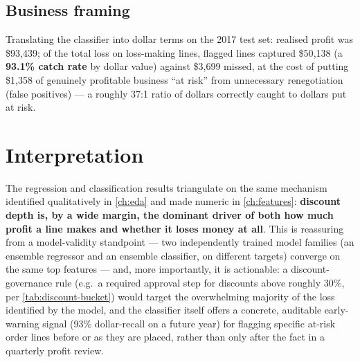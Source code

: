 \subsection{Business framing}
\label{sec:business-framing}
Translating the classifier into dollar terms on the 2017 test set:
realised profit was \$93{,}439; of the total loss on loss-making lines,
flagged lines captured \$50{,}138 (a \textbf{93.1\% catch rate} by
dollar value) against \$3{,}699 missed, at the cost of putting
\$1{,}358 of genuinely profitable business ``at risk'' from unnecessary
renegotiation (false positives) — a roughly 37:1 ratio of dollars
correctly caught to dollars put at risk.

\section{Interpretation}
The regression and classification results triangulate on the same
mechanism identified qualitatively in \cref{ch:eda} and made numeric in
\cref{ch:features}: \textbf{discount depth is, by a wide margin, the
dominant driver of both how much profit a line makes and whether it
loses money at all}. This is reassuring from a model-validity standpoint
— two independently trained model families (an ensemble regressor and an
ensemble classifier, on different targets) converge on the same top
features — and, more importantly, it is actionable: a discount-governance
rule (e.g.\ a required approval step for discounts above roughly 30\%,
per \cref{tab:discount-bucket}) would target the overwhelming majority of
the loss identified by the model, and the classifier itself offers a
concrete, auditable early-warning signal (93\% dollar-recall on a future
year) for flagging specific at-risk order lines before or as they are
placed, rather than only after the fact in a quarterly profit review.
